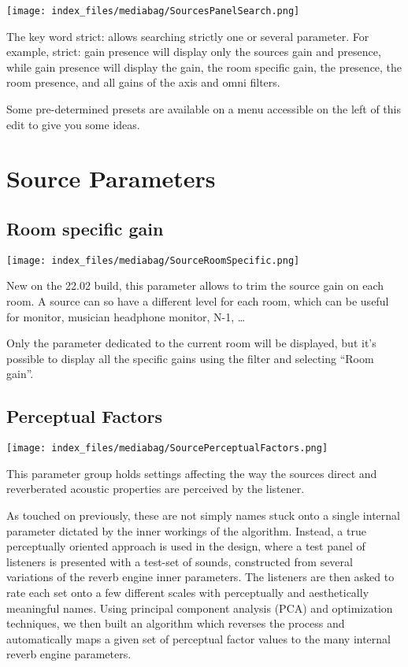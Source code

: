 \documentclass[
  letterpaper,
  DIV=11,
  numbers=noendperiod]{scrreport}
\begin{document}
\texttt{[image: index\_files/mediabag/SourcesPanelSearch.png]}

The key word strict: allows searching strictly one or several parameter.
For example, strict: gain presence will display only the sources gain
and presence, while gain presence will display the gain, the room
specific gain, the presence, the room presence, and all gains of the
axis and omni filters.

Some pre-determined presets are available on a menu accessible on the
left of this edit to give you some ideas.

\hypertarget{sources-parameters}{%
\chapter{Source Parameters}\label{sources-parameters}}

\hypertarget{room-specific-gain}{%
\section{Room specific gain}\label{room-specific-gain}}

\texttt{[image: index\_files/mediabag/SourceRoomSpecific.png]}

New on the 22.02 build, this parameter allows to trim the source gain on
each room. A source can so have a different level for each room, which
can be useful for monitor, musician headphone monitor, N-1, \ldots{}

Only the parameter dedicated to the current room will be displayed, but
it's possible to display all the specific gains using the filter and
selecting ``Room gain''.

\hypertarget{sources-parameters-perceptual-factor}{%
\section{Perceptual
Factors}\label{sources-parameters-perceptual-factor}}

\texttt{[image: index\_files/mediabag/SourcePerceptualFactors.png]}

This parameter group holds settings affecting the way the sources direct
and reverberated acoustic properties are perceived by the listener.

As touched on previously, these are not simply names stuck onto a single
internal parameter dictated by the inner workings of the algorithm.
Instead, a true perceptually oriented approach is used in the design,
where a test panel of listeners is presented with a test-set of sounds,
constructed from several variations of the reverb engine inner
parameters. The listeners are then asked to rate each set onto a few
different scales with perceptually and aesthetically meaningful names.
Using principal component analysis (PCA) and optimization techniques, we
then built an algorithm which reverses the process and automatically
maps a given set of perceptual factor values to the many internal reverb
engine parameters.
\end{document}
